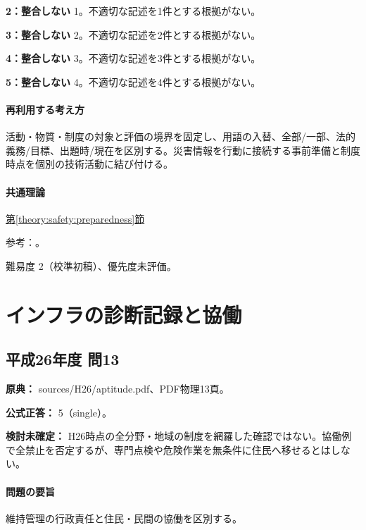 \noindent\textbf{2：整合しない} 1。不適切な記述を1件とする根拠がない。\par

\noindent\textbf{3：整合しない} 2。不適切な記述を2件とする根拠がない。\par

\noindent\textbf{4：整合しない} 3。不適切な記述を3件とする根拠がない。\par

\noindent\textbf{5：整合しない} 4。不適切な記述を4件とする根拠がない。\par

\paragraph{再利用する考え方} 活動・物質・制度の対象と評価の境界を固定し、用語の入替、全部/一部、法的義務/目標、出題時/現在を区別する。災害情報を行動に接続する事前準備と制度時点を個別の技術活動に結び付ける。

\paragraph{共通理論} \hyperref[theory:safety:preparedness]{第\ref*{theory:safety:preparedness}節}

\par 参考：\cite{env_ar5,env_rain2017,env_evac2021,env_warning2026}。

\par 難易度 2（校準初稿）、優先度未評価。

\section{インフラの診断記録と協働}

\subsection{平成26年度 問13}
\label{q:h26-reg-apt-13}

\noindent\textbf{原典：} sources/H26/aptitude.pdf、PDF物理13頁。

\textbf{公式正答：} 5（single）。

\par\textbf{検討未確定：} H26時点の全分野・地域の制度を網羅した確認ではない。協働例で全禁止を否定するが、専門点検や危険作業を無条件に住民へ移せるとはしない。

\paragraph{問題の要旨} 維持管理の行政責任と住民・民間の協働を区別する。

